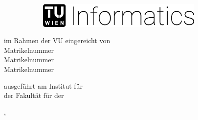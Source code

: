 \begin{titlepage}

  \begingroup
	

   \vspace*{0.5cm}
  \begin{figure}[h]
    \centering
    \begin{subfigure}{.5\textwidth}
     \hspace{-5.5cm}
     \includegraphics[height=35pt]{figs/logo.png}
    \end{subfigure}%
  \end{figure}

  \vspace*{1.5cm}
  
  \begin{center}
        
    {\huge\textbf{\thesistitle}}

    \vspace{2.25cm}

    \begin{minipage}[t][0.33\paperheight]{\textwidth}
      \centering
      {\Large \textbf{\thesisdegree}}
      \vfill
      im Rahmen der VU 
      \vfill
      {\Large\textbf{\thesisstudies}}
      \vfill
      eingereicht von
      \vfill
      {\Large\textbf{\thesisauthorone}}\\[1mm]
      Matrikelnummer~\thesisstudentnumber
       \vfill
      {\Large\textbf{\thesisauthortwo}}\\[1mm]
      Matrikelnummer~\thesisstudentnumbe
       \vfill
      {\Large\textbf{\thesisauthorthree}}\\[1mm]
      Matrikelnummer~\thesisstudentnumb
    \end{minipage}
               
  \end{center}

  \vfill

  \noindent ausgef\"{u}hrt am Institut f\"{u}r \thesisinstitute\\
  der Fakult\"{a}t f\"{u}r \thesisfaculty{} der \thesisuniversity\\

  \vspace{3cm}

  \noindent \thesisplace{}, \thesisdate \hspace{1cm}%
  \endgroup
  
\end{titlepage}
